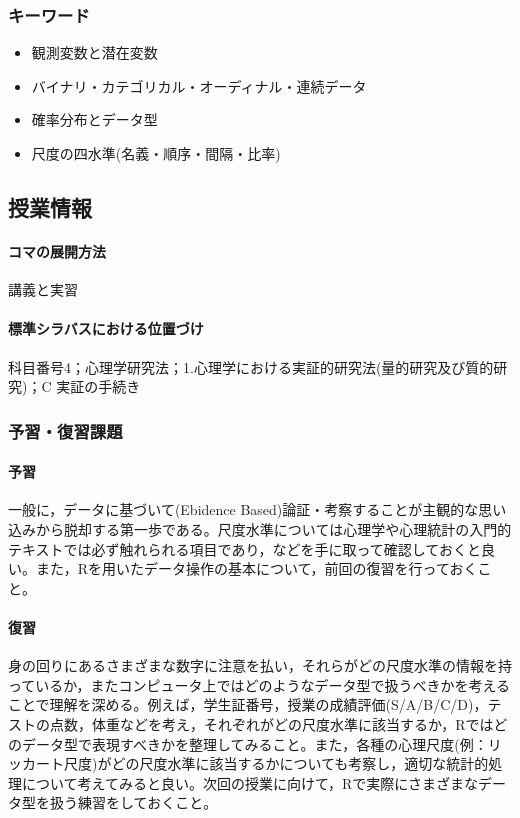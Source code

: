 \subsubsection{キーワード}
\begin{itemize}
	\item 観測変数と潜在変数
	\item バイナリ・カテゴリカル・オーディナル・連続データ
	\item 確率分布とデータ型
	\item 尺度の四水準(名義・順序・間隔・比率)
\end{itemize}

\subsection{授業情報}
\paragraph{コマの展開方法}
講義と実習
\paragraph{標準シラバスにおける位置づけ}
科目番号4；心理学研究法；1.心理学における実証的研究法(量的研究及び質的研究)；C 実証の手続き
\subsubsection{予習・復習課題}
\paragraph{予習}
一般に，データに基づいて(Ebidence Based)論証・考察することが主観的な思い込みから脱却する第一歩である。尺度水準については心理学や心理統計の入門的テキストでは必ず触れられる項目であり，\textcite{Miura201705,Kawabata201408,Yamada2004,kosugi2018,kosugi2019}などを手に取って確認しておくと良い。また，Rを用いたデータ操作の基本について，前回の復習を行っておくこと。
\paragraph{復習}
身の回りにあるさまざまな数字に注意を払い，それらがどの尺度水準の情報を持っているか，またコンピュータ上ではどのようなデータ型で扱うべきかを考えることで理解を深める。例えば，学生証番号，授業の成績評価(S/A/B/C/D)，テストの点数，体重などを考え，それぞれがどの尺度水準に該当するか，Rではどのデータ型で表現すべきかを整理してみること。また，各種の心理尺度(例：リッカート尺度)がどの尺度水準に該当するかについても考察し，適切な統計的処理について考えてみると良い。次回の授業に向けて，Rで実際にさまざまなデータ型を扱う練習をしておくこと。